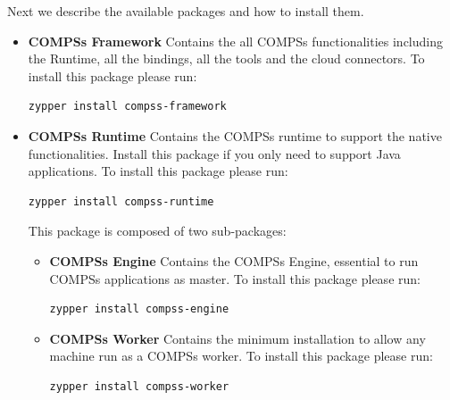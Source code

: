 \newpage
Next we describe the available packages and how to install them. 


\begin{itemize}
 \item \textbf{COMPSs Framework} \newline
       Contains the all COMPSs functionalities including the Runtime, all the bindings, all the tools and the cloud connectors.
       \newline
       To install this package please run:
       \begin{lstlisting}[language=bash]
	  zypper install compss-framework
       \end{lstlisting}
 \item \textbf{COMPSs Runtime} \newline
       Contains the COMPSs runtime to support the native functionalities. Install this package if you only need to support Java
       applications.
       \newline
       To install this package please run:
       \begin{lstlisting}[language=bash]
	  zypper install compss-runtime
       \end{lstlisting}
       This package is composed of two sub-packages:
       \begin{itemize}
        \item \textbf{COMPSs Engine} \newline
	      Contains the COMPSs Engine, essential to run COMPSs applications as master.
	      \newline
	      To install this package please run:
	      \begin{lstlisting}[language=bash]
		  zypper install compss-engine
	      \end{lstlisting}
        \item \textbf{COMPSs Worker} \newline
              Contains the minimum installation to allow any machine run as a COMPSs worker.
              \newline
              To install this package please run:
	      \begin{lstlisting}[language=bash]
		  zypper install compss-worker
	      \end{lstlisting}
       \end{itemize}


\end{itemize}
